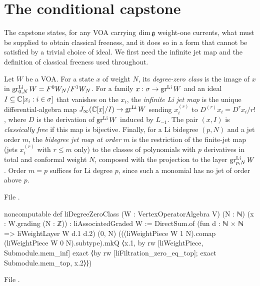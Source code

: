 \section{The conditional capstone}\label{l24:sec:capstone}

The capstone states, for any VOA carrying $\dim\mathfrak g$ weight-one currents, what must be supplied to
obtain classical freeness, and it does so in a form that cannot be satisfied by a trivial choice of
ideal. We first need the infinite jet map and the definition of classical freeness used throughout.

\begin{definition}\label{l24:def:lpcf}
Let $W$ be a VOA. For a state $x$ of weight $N$, its \emph{degree-zero class} is the image of $x$ in
$\operatorname{gr}^{\mathrm{Li}}_{0,N}W=F^0W_N/F^1W_N$. For a family $x:\sigma\to\operatorname{gr}^{\mathrm{Li}} W$ and an ideal
$I\subseteq{\mathbb{C}}[x_i:i\in\sigma]$ that vanishes on the $x_i$, the \emph{infinite Li jet map} is the unique
differential-algebra map $J_\infty({\mathbb{C}}[x]/I)\to\operatorname{gr}^{\mathrm{Li}} W$ sending $x_i^{(r)}$ to
$D^{(r)}x_i=D^rx_i/r!$, where $D$ is the derivation of $\operatorname{gr}^{\mathrm{Li}} W$ induced by $L_{-1}$. The pair
$(x,I)$ is \emph{classically free} if this map is bijective. Finally, for a Li bidegree $(p,N)$ and a jet order $m$, the
\emph{bidegree jet map at order $m$} is the restriction of the finite-jet map (jets $x_i^{(r)}$ with $r\le m$ only) to the
classes of polynomials with $p$ derivatives in total and conformal weight $N$, composed with the projection to the layer
$\operatorname{gr}^{\mathrm{Li}}_{p,N}W$. Order $m=p$ suffices for Li degree $p$, since such a monomial has no jet of order above $p$.
\end{definition}
\noindent File .
\begin{leancode}
noncomputable def liDegreeZeroClass (W : VertexOperatorAlgebra V) (N : ℕ)
    (x : W.grading (N : ℤ)) : liAssociatedGraded W :=
  DirectSum.of (fun d : ℕ × ℕ => liWeightLayer W d.1 d.2) (0, N)
    (((liWeightPiece W 1 N).comap (liWeightPiece W 0 N).subtype).mkQ
      ⟨x.1, by
        rw [liWeightPiece, Submodule.mem_inf]
        exact ⟨by rw [liFiltration_zero_eq_top]; exact Submodule.mem_top, x.2⟩⟩)
\end{leancode}
\noindent File .
